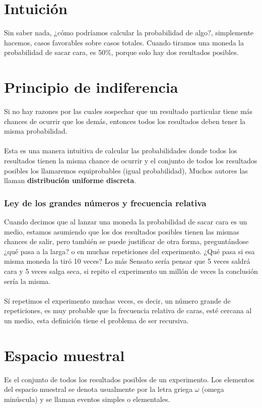 \documentclass[12pt]{book}
\begin{document}
\section{Intuici\'on}
Sin saber nada, ¿cómo podríamos calcular la probabilidad de algo?, simplemente hacemos, casos favorables sobre casos totales. Cuando tiramos una moneda la probabilidad de sacar cara, es 50\%, porque solo hay dos resultados posibles.
\section{Principio de indiferencia}
Si no hay razones por las cuales sospechar que un resultado particular tiene más chances de ocurrir que los demás, entonces todos los resultados deben tener la misma probabilidad.
\\
\\
Esta es una manera intuitiva de calcular las probabilidades donde todos los resultados tienen la misma chance de ocurrir y el conjunto de todos los resultados posibles los llamaremos equiprobables (igual probabilidad), Muchos autores las llaman \textbf{distribución uniforme discreta}. 

\subsubsection{Ley de los grandes números y frecuencia relativa}
Cuando decimos que  al lanzar una moneda la probabilidad  de sacar cara es un medio, estamos asumiendo que los dos resultados posibles tienen las mismas chances de salir, pero también se puede justificar de otra forma, preguntándose ¿qué pasa a la larga? o en muchas repeticiones del experimento.
¿Qué pasa si esa misma moneda la tiró 10 veces?  Lo más Sensato sería pensar que 5 veces saldrá cara y 5 veces salga seca, si repito el experimento un millón de veces la conclusión sería la misma.
\\
\\
Sí repetimos el experimento muchas veces, es decir, un número grande de repeticiones, es muy probable que la frecuencia relativa de caras, esté cercana al un medio, esta definición tiene el problema de ser recursiva.
\section{Espacio muestral}
Es el conjunto de todos los resultados posibles de un experimento. Los elementos del espacio muestral se denota usualmente por la letra griega $\omega $ (omega minúscula) y se llaman eventos simples o elementales.
\end{document}
